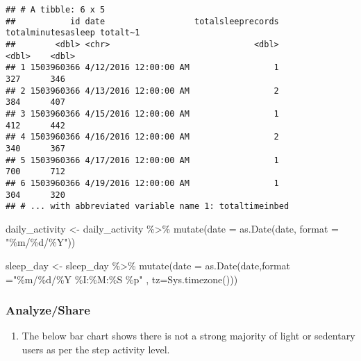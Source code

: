 \documentclass[
]{article}
\newenvironment{Shaded}{\begin{snugshade}}{\end{snugshade}}
\newcommand{\AttributeTok}[1]{\textcolor[rgb]{0.77,0.63,0.00}{#1}}
\newcommand{\FunctionTok}[1]{\textcolor[rgb]{0.00,0.00,0.00}{#1}}
\newcommand{\NormalTok}[1]{#1}
\newcommand{\OtherTok}[1]{\textcolor[rgb]{0.56,0.35,0.01}{#1}}
\newcommand{\SpecialCharTok}[1]{\textcolor[rgb]{0.00,0.00,0.00}{#1}}
\newcommand{\StringTok}[1]{\textcolor[rgb]{0.31,0.60,0.02}{#1}}
\providecommand{\tightlist}{%
  \setlength{\itemsep}{0pt}\setlength{\parskip}{0pt}}
\begin{document}
\begin{verbatim}
## # A tibble: 6 x 5
##           id date                  totalsleeprecords totalminutesasleep totalt~1
##        <dbl> <chr>                             <dbl>              <dbl>    <dbl>
## 1 1503960366 4/12/2016 12:00:00 AM                 1                327      346
## 2 1503960366 4/13/2016 12:00:00 AM                 2                384      407
## 3 1503960366 4/15/2016 12:00:00 AM                 1                412      442
## 4 1503960366 4/16/2016 12:00:00 AM                 2                340      367
## 5 1503960366 4/17/2016 12:00:00 AM                 1                700      712
## 6 1503960366 4/19/2016 12:00:00 AM                 1                304      320
## # ... with abbreviated variable name 1: totaltimeinbed
\end{verbatim}

\begin{Shaded}
\begin{Highlighting}[]
\NormalTok{daily\_activity }\OtherTok{\textless{}{-}}\NormalTok{ daily\_activity }\SpecialCharTok{\%\textgreater{}\%}
  \FunctionTok{mutate}\NormalTok{(}\AttributeTok{date =} \FunctionTok{as.Date}\NormalTok{(date, }\AttributeTok{format =} \StringTok{"\%m/\%d/\%Y"}\NormalTok{))}

\NormalTok{sleep\_day }\OtherTok{\textless{}{-}}\NormalTok{ sleep\_day }\SpecialCharTok{\%\textgreater{}\%}
  \FunctionTok{mutate}\NormalTok{(}\AttributeTok{date =} \FunctionTok{as.Date}\NormalTok{(date,}\AttributeTok{format =}\StringTok{"\%m/\%d/\%Y \%I:\%M:\%S \%p"}\NormalTok{ , }\AttributeTok{tz=}\FunctionTok{Sys.timezone}\NormalTok{()))}
\end{Highlighting}
\end{Shaded}

\hypertarget{analyzeshare}{%
\subsubsection{Analyze/Share}\label{analyzeshare}}

\begin{enumerate}
\def\labelenumi{\arabic{enumi}.}
\tightlist
\item
  The below bar chart shows there is not a strong majority of light or
  sedentary users as per the step activity level.
\end{enumerate}
\end{document}
